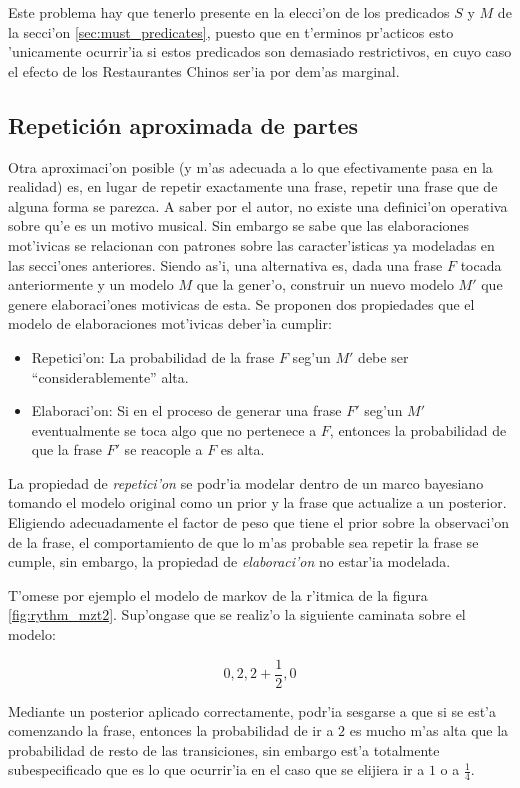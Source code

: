 Este problema hay que tenerlo presente en la elecci'on de los predicados $S$ y $M$ de la secci'on \ref{sec:must_predicates}, puesto que en t'erminos pr'acticos esto 'unicamente
ocurrir'ia si estos predicados son demasiado restrictivos, en cuyo caso el efecto de los Restaurantes Chinos ser'ia por dem'as marginal.


\subsection{Repetici\'on aproximada de partes}
Otra aproximaci'on posible (y m'as adecuada a lo que efectivamente pasa en la realidad) es, en lugar de repetir exactamente una frase, repetir una frase que de alguna forma se parezca. 
A saber por el autor, no existe una definici'on operativa sobre qu'e es un motivo musical. Sin embargo se sabe que las elaboraciones mot'ivicas se relacionan 
con patrones sobre las caracter'isticas ya modeladas en las secci'ones anteriores. Siendo as'i, una alternativa es, dada una frase $F$ tocada anteriormente y un modelo $M$ que la gener'o, 
construir un nuevo modelo $M'$ que genere elaboraci'ones motivicas de esta. Se proponen dos propiedades que el modelo de elaboraciones mot'ivicas deber'ia cumplir:

\begin{itemize}
 \item Repetici'on: La probabilidad de la frase $F$ seg'un $M'$ debe ser ``considerablemente'' alta. 
 \item Elaboraci'on: Si en el proceso de generar una frase $F'$ seg'un $M'$ eventualmente se toca algo que no pertenece a $F$, entonces la probabilidad de que la frase $F'$ se reacople a $F$ es alta.
\end{itemize}

La propiedad de \emph{repetici'on} se podr'ia modelar dentro de un marco bayesiano tomando el modelo original como un prior y la frase que actualize a un posterior. 
Eligiendo adecuadamente el factor de peso que tiene el prior sobre la observaci'on de la frase, el comportamiento de que lo m'as probable sea repetir la frase se cumple, 
sin embargo, la propiedad de \emph{elaboraci'on} no estar'ia modelada.

T'omese por ejemplo el modelo de markov de la r'itmica de la figura \ref{fig:rythm_mzt2}. Sup'ongase que se realiz'o la siguiente caminata sobre el modelo:

$$0, 2, 2+\frac{1}{2}, 0$$

Mediante un posterior aplicado correctamente, podr'ia sesgarse a que si se est'a comenzando la frase, entonces la probabilidad de ir a $2$ es mucho m'as alta que la probabilidad de resto
de las transiciones, sin embargo est'a totalmente subespecificado que es lo que ocurrir'ia en el caso que se elijiera ir a $1$ o a $\frac{1}{4}$. 

